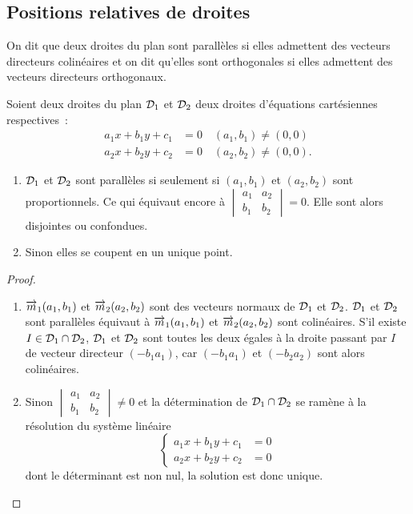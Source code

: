 \subsection{Positions relatives de droites}
On dit que deux droites du plan sont parallèles si elles admettent des 
vecteurs directeurs colinéaires et on dit qu'elles sont orthogonales si elles 
admettent des vecteurs directeurs orthogonaux.

\begin{prop}
  Soient deux droites du plan \(\mathcal{D}_1\) et \(\mathcal{D}_2\) deux droites d'équations 
  cartésiennes respectives~:
  \begin{align}
    a_1x + b_1y + c_1& = 0 \quad (a_1 , b_1)\neq(0 , 0)\\
    a_2x + b_2y + c_2& = 0 \quad (a_2 , b_2)\neq(0 , 0).
  \end{align}

  \begin{enumerate}
    \item \(\mathcal{D}_1\) et \(\mathcal{D}_2\) sont parallèles si seulement si \((a_1 , 
      b_1)\) et \((a_2 , b_2)\) sont proportionnels. Ce qui équivaut encore à 
      \(
      \begin{vmatrix}
        a_1 & a_2 \\
        b_1 & b_2
      \end{vmatrix} = 0\).
      Elle sont alors disjointes ou confondues.
    \item Sinon elles se coupent en un unique point.
  \end{enumerate}
\end{prop}

\begin{proof}
  \begin{enumerate}
    \item \(\overrightarrow{m}_1(a_1 , b_1)\) et \(\overrightarrow{m}_2(a_2 , b_2)\) sont des 
      vecteurs normaux de \(\mathcal{D}_1\) et \(\mathcal{D}_2\). \(\mathcal{D}_1\) et \(\mathcal{D}_2\) sont 
      parallèles équivaut à \(\overrightarrow{m}_1(a_1 , b_1)\) et \(\overrightarrow{m}_2(a_2 , 
      b_2)\) sont colinéaires. S'il existe \(I \in \mathcal{D}_1 \cap \mathcal{D}_2\), 
      \(\mathcal{D}_1\) et \(\mathcal{D}_2\) sont toutes les deux égales à la droite passant 
      par \(I\) de vecteur directeur \((-b_1 a_1)\), car \((-b_1 a_1)\) et 
      \((-b_2 a_2)\) sont alors colinéaires.
    \item Sinon \(\begin{vmatrix} a_1 & a_2 \\ b_1 & b_2 \end{vmatrix} \neq 
      0\) et la détermination de \(\mathcal{D}_1 \cap \mathcal{D}_2\) se ramène à la 
      résolution du système linéaire
      \begin{equation}
        \begin{cases}
          a_1x + b_1y + c_1 & = 0 \\
          a_2x + b_2y + c_2 & = 0
        \end{cases}
      \end{equation}
      dont le déterminant est non nul, la solution est donc unique.
  \end{enumerate}
\end{proof}

